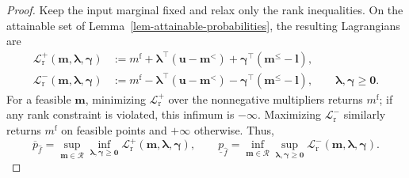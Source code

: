 \begin{proof}
  Keep the input marginal fixed and relax only the rank inequalities. On the attainable set of Lemma~\ref{lem-attainable-probabilities}, the resulting Lagrangians are
  \begin{equation}
    \begin{aligned}
      \mathcal L_{\mathrm r}^+(\bm m,\bm\lambda,\bm\gamma)
      &:=m^{\mathrm f}+\bm\lambda^\top\left(\bm u-\bm m^{<}\right)
        +\bm\gamma^\top\left(\bm m^{\le}-\bm l\right),\\
      \mathcal L_{\mathrm r}^-(\bm m,\bm\lambda,\bm\gamma)
      &:=m^{\mathrm f}-\bm\lambda^\top\left(\bm u-\bm m^{<}\right)
        -\bm\gamma^\top\left(\bm m^{\le}-\bm l\right),
        \qquad\bm\lambda,\bm\gamma\ge\bm0.
    \end{aligned}
    \label{eq-rank-probability-lagrangians}
  \end{equation}
  For a feasible $\bm m$, minimizing $\mathcal L_{\mathrm r}^+$ over the nonnegative multipliers returns $m^{\mathrm f}$; if any rank constraint is violated, this infimum is $-\infty$. Maximizing $\mathcal L_{\mathrm r}^-$ similarly returns $m^{\mathrm f}$ on feasible points and $+\infty$ otherwise. Thus,
  \begin{equation}
    \overline p_{\hat f}=\sup_{\bm m\in\mathcal R}
      \inf_{\bm\lambda,\bm\gamma\ge\bm0}\mathcal L_{\mathrm r}^+(\bm m,\bm\lambda,\bm\gamma),
    \qquad
    \underline p_{\hat f}=\inf_{\bm m\in\mathcal R}
      \sup_{\bm\lambda,\bm\gamma\ge\bm0}\mathcal L_{\mathrm r}^-(\bm m,\bm\lambda,\bm\gamma).
    \label{eq-primal-minimax-representation}
  \end{equation}


\end{proof}
